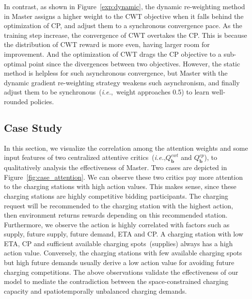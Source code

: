 \documentclass[sigconf]{acmart}
\newcommand{\stddpg}{{\sc Master}\xspace}
\newcommand{\ie}{\emph{i.e.},\xspace}
\newcommand\figref[1]{Figure~\ref{#1}}
\begin{document}
In contrast, as shown in \figref{exp:dynamic}, the dynamic re-weighting method in \stddpg assigns a higher weight to the CWT objective when it falls behind the optimization of CP, and adjust them to a synchronous convergence pace.
As the training step increase, the convergence of CWT overtakes the CP. This is because the distribution of CWT reward is more even, having
larger room for improvement.
And the optimization of CWT drags the CP objective to a sub-optimal point since the divergences between two objectives.
However, the static method is helpless for
such asynchronous convergence, but \stddpg with the dynamic gradient re-weighting strategy weakens such asynchronism, and finally adjust them to be synchronous~(\ie~weight approaches 0.5) to learn well-rounded policies.



\subsection{Case Study}
In this section, we visualize the correlation among the attention weights and some input features of two centralized attentive critics~(\ie $Q_{\bm{b}}^{cwt}$ and  $Q_{\bm{b}}^{cp}$), to qualitatively analysis the effectiveness of \stddpg.
Two cases are depicted in \figref{fig:case_attention}. We can observe these two critics pay more attention to the charging stations with high action values. This makes sense, since these charging stations are highly competitive bidding participants.
The charging request will be recommended to the charging station with the highest action, then environment returns rewards depending on this recommended station.
Furthermore, we observe the action is highly correlated with factors such as supply, future supply, future demand, ETA and CP. A charging station with low ETA, CP and sufficient available charging spots~(supplies) always has a high action value. Conversely, the charging stations with few available charging spots but high future demands usually derive a low action value for avoiding future charging competitions. The above observations validate the effectiveness of our model to mediate the contradiction between the space-constrained charging capacity and spatiotemporally unbalanced charging demands.
\end{document}
